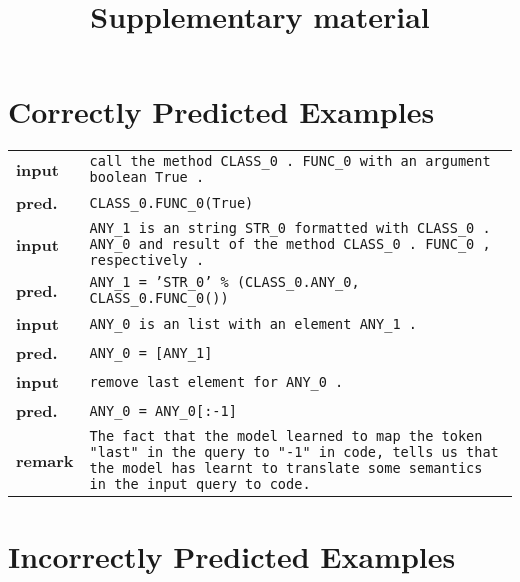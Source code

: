 \documentclass{article}
\title{Supplementary material}
\author{}
\date{}
\begin{document}
  \maketitle

  \section{Correctly Predicted Examples}

  \begin{tabular}{ l p{}}
    \hline
		\textbf{input} & \texttt{call the method CLASS\_0 . FUNC\_0 with an argument boolean True .} \\
    \textbf{pred.} & \texttt{CLASS\_0.FUNC\_0(True)} \\
    \hline
		\textbf{input} & \texttt{ANY\_1 is an string STR\_0 formatted with CLASS\_0 . ANY\_0 and 
                      result of the method CLASS\_0 . FUNC\_0 , respectively .}	\\
		\textbf{pred.} & \texttt{ANY\_1 = 'STR\_0' \% (CLASS\_0.ANY\_0, CLASS\_0.FUNC\_0())} \\
    \hline
    \textbf{input} & \texttt{ANY\_0 is an list with an element ANY\_1 .} \\
    \textbf{pred.} & \texttt{ANY\_0 = [ANY\_1]} \\
    \hline
    \textbf{input} & \texttt{remove last element for ANY\_0 .} \\
    \textbf{pred.} & \texttt{ANY\_0 = ANY\_0[:-1]} \\
    \textbf{remark}& \texttt{The fact that the model learned to map the token "last" in the 
                     query to "-1" in code, tells us that the model has learnt to translate some 
                     semantics in the input query to code.} \\
    \hline
  \end{tabular}

  \section{Incorrectly Predicted Examples}
\end{document}
